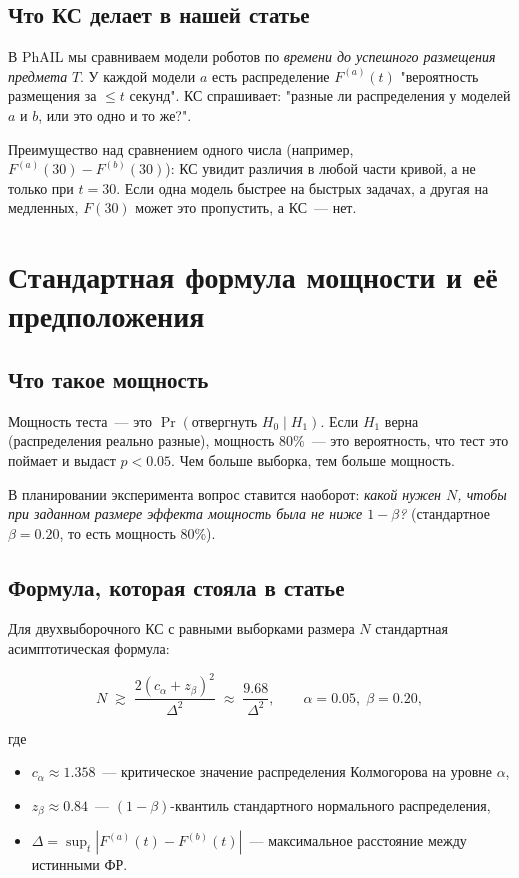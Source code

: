 \documentclass[11pt]{article}
\begin{document}
\subsection{Что КС делает в нашей статье}

В PhAIL мы сравниваем модели роботов по \emph{времени до успешного размещения предмета} $T$. У каждой модели $a$ есть распределение $F^{(a)}(t)$ "вероятность размещения за $\le t$ секунд". КС спрашивает: "разные ли распределения у моделей $a$ и $b$, или это одно и то же?".

Преимущество над сравнением одного числа (например, $F^{(a)}(30) - F^{(b)}(30)$): КС увидит различия в любой части кривой, а не только при $t = 30$. Если одна модель быстрее на быстрых задачах, а другая на медленных, $F(30)$ может это пропустить, а КС~--- нет.

\section{Стандартная формула мощности и её предположения}

\subsection{Что такое мощность}

Мощность теста~--- это $\Pr(\text{отвергнуть } H_0 \mid H_1)$. Если $H_1$ верна (распределения реально разные), мощность 80\%~--- это вероятность, что тест это поймает и выдаст $p < 0.05$. Чем больше выборка, тем больше мощность.

В планировании эксперимента вопрос ставится наоборот: \emph{какой нужен $N$, чтобы при заданном размере эффекта мощность была не ниже $1{-}\beta$?} (стандартное $\beta = 0.20$, то есть мощность 80\%).

\subsection{Формула, которая стояла в статье}

Для двухвыборочного КС с равными выборками размера $N$ стандартная асимптотическая формула:

\[
N \;\gtrsim\; \frac{2(c_\alpha + z_\beta)^2}{\Delta^2}
\;\approx\; \frac{9.68}{\Delta^2},
\qquad \alpha=0.05,\; \beta=0.20,
\]

где
\begin{itemize}[leftmargin=2em, itemsep=1pt]
\item $c_\alpha \approx 1.358$~--- критическое значение распределения Колмогорова на уровне $\alpha$,
\item $z_\beta \approx 0.84$~--- $(1-\beta)$-квантиль стандартного нормального распределения,
\item $\Delta = \sup_t |F^{(a)}(t) - F^{(b)}(t)|$~--- максимальное расстояние между истинными ФР.
\end{itemize}
\end{document}
